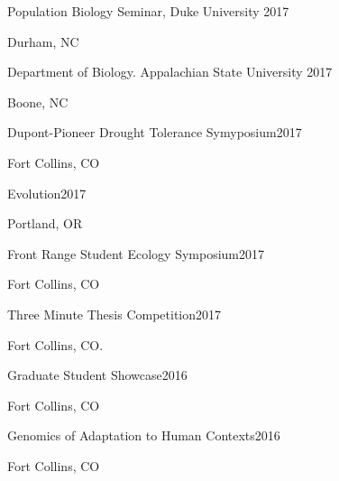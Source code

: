 \documentclass[12pt,english]{article}
\begin{document}
\hspace*{1.0em}Population Biology Seminar,  Duke University  \hfill 2017 \par
\hspace*{2.0em}Durham, NC \par\vspace{0.5ex}

\hspace*{1.0em}Department of Biology. Appalachian State University  \hfill 2017 \par
\hspace*{2.0em}Boone, NC  \par\vspace{0.5ex}

\hspace*{1.0em}Dupont-Pioneer Drought Tolerance Symyposium\hfill 2017 \par
\hspace*{2.0em}Fort Collins, CO \par\vspace{0.5ex}

\hspace*{1.0em}Evolution\hfill 2017 \par
\hspace*{2.0em}Portland, OR \par\vspace{0.5ex}

\hspace*{1.0em}Front Range Student Ecology Symposium\hfill 2017 \par
\hspace*{2.0em}Fort Collins, CO \par\vspace{0.5ex}

\hspace*{1.0em}Three Minute Thesis Competition\hfill 2017 \par
\hspace*{2.0em}Fort Collins, CO. \par\vspace{0.5ex}

\hspace*{1.0em}Graduate Student Showcase\hfill 2016 \par
\hspace*{2.0em}Fort Collins, CO \par\vspace{0.5ex}

\hspace*{1.0em}Genomics of Adaptation to Human Contexts\hfill 2016 \par
\hspace*{2.0em}Fort Collins, CO \par\vspace{0.5ex}
\end{document}
